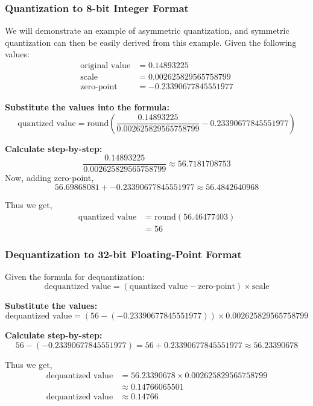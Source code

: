 \subsubsection{Quantization to 8-bit Integer Format}
We will demonstrate an example of asymmetric quantization, and symmetric quantization can then be easily derived from this example.
Given the following values:
\begin{align}
\text{original value} &= 0.14893225 \\
\text{scale} &= 0.002625829565758799 \\
\text{zero-point} &= -0.23390677845551977
\end{align}

\textbf{Substitute the values into the formula:}
\[
\text{quantized value} = \text{round}\left(\frac{0.14893225}{0.002625829565758799} - 0.23390677845551977\right)
\]

\textbf{Calculate step-by-step:}
\[
\frac{0.14893225}{0.002625829565758799} \approx 56.7181708753
\]
Now, adding zero-point,
\[ 56.69868081 + -0.23390677845551977 \approx 56.4842640968 \]

Thus we get,
\begin{equation}
    \begin{aligned}
        \text{quantized value} &= \text{round}(56.46477403) \\
        &= \boxed{56}
    \end{aligned}
\end{equation}

\subsubsection{Dequantization to 32-bit Floating-Point Format}

Given the formula for dequantization:
\[
\text{dequantized value} = (\text{quantized value} - \text{zero-point}) \times \text{scale}
\]

\textbf{Substitute the values:}
\[
\text{dequantized value} = (56 - (-0.23390677845551977)) \times 0.002625829565758799
\]

\textbf{Calculate step-by-step:}
\[
56 - (-0.23390677845551977) = 56 + 0.23390677845551977
                         \approx 56.23390678
\]

Thus we get,
\begin{equation}
    \begin{aligned}
    \text{dequantized value} &= 56.23390678 \times 0.002625829565758799\\
                            &\approx 0.14766065501\\
    \text{dequantized value} &\approx \boxed{0.14766}
    \end{aligned}
\end{equation}


